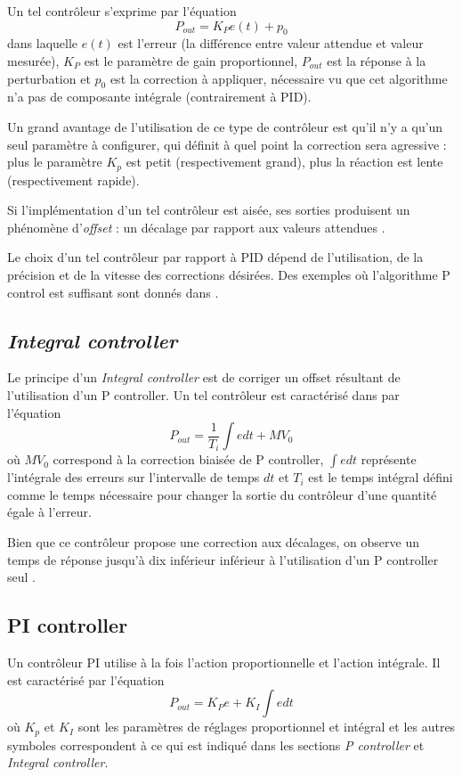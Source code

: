 \documentclass[a4paper,10pt]{report}
\begin{document}
Un tel contrôleur s'exprime par l'équation
\begin{equation}P_{out} = K_{P}e(t) + p_0\end{equation}
dans laquelle $e(t)$ est l'erreur (la différence entre valeur attendue et valeur mesurée), $K_{P}$ est le paramètre de gain proportionnel, $P_{out}$ est la réponse à la perturbation et $p_0$ est la correction à appliquer, nécessaire vu que cet algorithme n'a pas de composante intégrale (contrairement à PID).

Un grand avantage de l'utilisation de ce type de contrôleur est qu'il n'y a qu'un seul paramètre à configurer, qui définit à quel point la correction sera agressive : plus le paramètre $K_{p}$ est petit (respectivement grand), plus la réaction est lente (respectivement rapide).

Si l'implémentation d'un tel contrôleur est aisée, ses sorties produisent un phénomène d'\emph{offset} : un décalage par rapport aux valeurs attendues \cite{svrcek2014real}.

Le choix d'un tel contrôleur par rapport à PID dépend de l'utilisation, de la précision et de la vitesse des corrections désirées.
Des exemples où l'algorithme P control est suffisant sont donnés dans \cite{sellers2001overview}.

\subsection{\emph{Integral controller}}
Le principe d'un \emph{Integral controller} est de corriger un offset résultant de l'utilisation d'un P controller.
Un tel contrôleur est caractérisé dans \cite{svrcek2014real} par l'équation
\begin{equation}P_{out} = \frac{1}{T_{i}}\int e dt + MV_{0}\end{equation}
où $MV_{0}$ correspond à la correction biaisée de P controller,
$\int e dt$ représente l'intégrale des erreurs sur l'intervalle de temps $dt$ et $T_{i}$ est le temps intégral défini comme le temps nécessaire pour changer la sortie du contrôleur d'une quantité égale à l'erreur.

Bien que ce contrôleur propose une correction aux décalages, on observe un temps de réponse jusqu'à dix inférieur inférieur à l'utilisation d'un P controller seul \cite{svrcek2014real}.

\subsection{PI controller}
Un contrôleur PI utilise à la fois l'action proportionnelle et l'action intégrale.
Il est caractérisé par l'équation
\begin{equation}P_{out} = K_{P} e + K_{I} \int e dt\end{equation}
où $K_{p}$ et $K_{I}$ sont les paramètres de réglages proportionnel et intégral
et les autres symboles correspondent à ce qui est indiqué dans les sections \emph{P controller} et \emph{Integral controller}.
\end{document}
